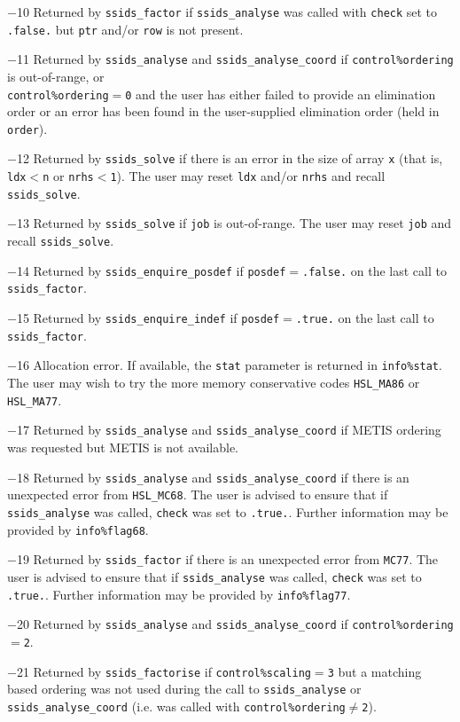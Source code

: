 \documentclass{spral}
\begin{document}
\begin{description}
\item{$-$10} Returned by {\tt ssids\_factor}
            if {\tt ssids\_analyse} was called with {\tt check} set to
            {\tt .false.} but {\tt ptr} and/or {\tt row} is not present.
\item{$-$11} Returned by {\tt ssids\_analyse}  and {\tt ssids\_analyse\_coord}
            if {\tt control\%ordering} is out-of-range, or\\
            {\tt control\%ordering}$=${\tt 0} and the user has either failed
            to provide an elimination order or an error has been found
            in the user-supplied elimination order (held in {\tt order}).
\item{$-$12} Returned by {\tt ssids\_solve} if
            there is an error in the size of array {\tt x} (that is,
            {\tt ldx$<$n} or {\tt nrhs$<$1}). The user may reset {\tt ldx}
            and/or {\tt nrhs} and recall
            {\tt ssids\_solve}.
\item{$-$13} Returned by {\tt ssids\_solve} if {\tt job} is out-of-range.
            The user may reset {\tt job} and recall {\tt ssids\_solve}.
\item{$-$14} Returned by {\tt ssids\_enquire\_posdef} if
            {\tt posdef}$=${\tt .false.} on the last call
            to {\tt ssids\_factor}.
\item{$-$15} Returned by {\tt ssids\_enquire\_indef} if
            {\tt posdef}$=${\tt .true.} on the last call to
            {\tt ssids\_factor}.
\item{$-$16} Allocation error. If available, the {\tt stat}
            parameter is returned in {\tt info\%stat}.
            The user may wish to try the more memory conservative codes
            {\tt HSL\_MA86} or {\tt HSL\_MA77}.
\item{$-$17} Returned by {\tt ssids\_analyse} and {\tt ssids\_analyse\_coord} if
            METIS ordering was requested but METIS is not available.
\item{$-$18} Returned by {\tt ssids\_analyse} and
            {\tt ssids\_analyse\_coord} if there is an unexpected
            error  from {\tt HSL\_MC68}. The user is advised to
            ensure that if {\tt ssids\_analyse}
            was called,  {\tt check} was set to {\tt .true.}.
            Further information may be provided by {\tt info\%flag68}.
\item{$-$19} Returned by {\tt ssids\_factor} if there is an unexpected
            error  from {\tt MC77}. The user is advised to
            ensure that if {\tt ssids\_analyse}
            was called,  {\tt check} was set to {\tt .true.}.
            Further information may be provided by {\tt info\%flag77}.
\item{$-$20} Returned by {\tt ssids\_analyse} and {\tt ssids\_analyse\_coord} if
            {\tt control\%ordering}$=${\tt 2}.
\item{$-$21} Returned by {\tt ssids\_factorise} if {\tt control\%scaling$=$3}
            but a matching based ordering was not used during the call to
            {\tt ssids\_analyse} or {\tt ssids\_analyse\_coord} (i.e. was
            called with
            {\tt control\%ordering}$\ne${\tt 2}).
\end{description}
\end{document}

